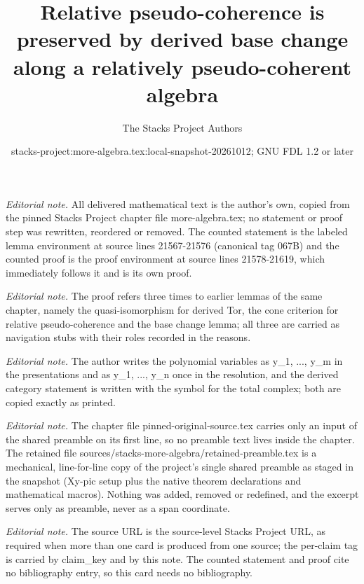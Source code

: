 \documentclass[10pt,a4paper]{amsart}
\title{Relative pseudo-coherence is preserved by derived base change along a relatively pseudo-coherent algebra}
\author{The Stacks Project Authors}
\date{stacks-project:more-algebra.tex:local-snapshot-20261012; GNU FDL 1.2 or later}
\theoremstyle{plain}
\theoremstyle{definition}
\theoremstyle{remark}
\numberwithin{equation}{subsection}
\begin{document}
\maketitle
\setcounter{subsection}{1}
\noindent\textit{Editorial note.} All delivered mathematical text is the author's own, copied from the pinned Stacks Project chapter file more-algebra.tex; no statement or proof step was rewritten, reordered or removed. The counted statement is the labeled lemma environment at source lines 21567-21576 (canonical tag 067B) and the counted proof is the proof environment at source lines 21578-21619, which immediately follows it and is its own proof.\par\medskip
\noindent\textit{Editorial note.} The proof refers three times to earlier lemmas of the same chapter, namely the quasi-isomorphism for derived Tor, the cone criterion for relative pseudo-coherence and the base change lemma; all three are carried as navigation stubs with their roles recorded in the reasons.\par\medskip
\noindent\textit{Editorial note.} The author writes the polynomial variables as y\_1, ..., y\_m in the presentations and as y\_1, ..., y\_n once in the resolution, and the derived category statement is written with the symbol for the total complex; both are copied exactly as printed.\par\medskip
\noindent\textit{Editorial note.} The chapter file pinned-original-source.tex carries only an input of the shared preamble on its first line, so no preamble text lives inside the chapter. The retained file sources/stacks-more-algebra/retained-preamble.tex is a mechanical, line-for-line copy of the project's single shared preamble as staged in the snapshot (Xy-pic setup plus the native theorem declarations and mathematical macros). Nothing was added, removed or redefined, and the excerpt serves only as preamble, never as a span coordinate.\par\medskip
\noindent\textit{Editorial note.} The source URL is the source-level Stacks Project URL, as required when more than one card is produced from one source; the per-claim tag is carried by claim\_key and by this note. The counted statement and proof cite no bibliography entry, so this card needs no bibliography.\par\medskip
\end{document}
